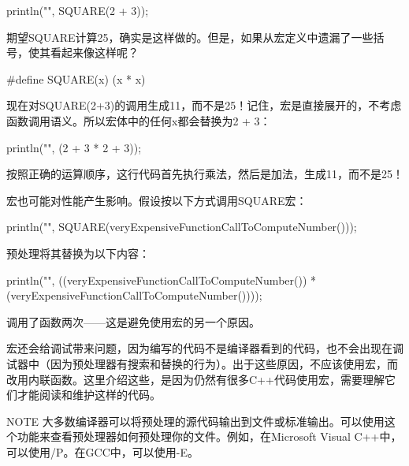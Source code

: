 \begin{cpp}
println("{}", SQUARE(2 + 3));
\end{cpp}

期望SQUARE计算25，确实是这样做的。但是，如果从宏定义中遗漏了一些括号，使其看起来像这样呢？

\begin{cpp}
#define SQUARE(x) (x * x)
\end{cpp}

现在对SQUARE(2+3)的调用生成11，而不是25！记住，宏是直接展开的，不考虑函数调用语义。所以宏体中的任何x都会替换为2 + 3：

\begin{cpp}
println("{}", (2 + 3 * 2 + 3));
\end{cpp}

按照正确的运算顺序，这行代码首先执行乘法，然后是加法，生成11，而不是25！

宏也可能对性能产生影响。假设按以下方式调用SQUARE宏：

\begin{cpp}
println("{}", SQUARE(veryExpensiveFunctionCallToComputeNumber()));
\end{cpp}

预处理将其替换为以下内容：

\begin{cpp}
println("{}", ((veryExpensiveFunctionCallToComputeNumber()) *
        (veryExpensiveFunctionCallToComputeNumber())));
\end{cpp}

调用了函数两次——这是避免使用宏的另一个原因。

宏还会给调试带来问题，因为编写的代码不是编译器看到的代码，也不会出现在调试器中（因为预处理器有搜索和替换的行为）。出于这些原因，不应该使用宏，而改用内联函数。这里介绍这些，是因为仍然有很多C++代码使用宏，需要理解它们才能阅读和维护这样的代码。

\begin{myNotic}{NOTE}
大多数编译器可以将预处理的源代码输出到文件或标准输出。可以使用这个功能来查看预处理器如何预处理你的文件。例如，在Microsoft Visual C++中，可以使用/P。在GCC中，可以使用-E。
\end{myNotic}





